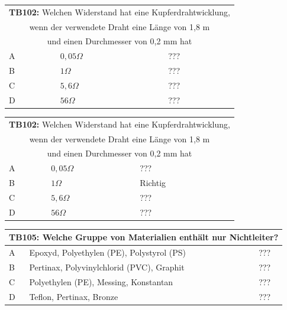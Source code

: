 \begin{frame}
	\begin{small}	
	\begin{tabular}{|l|l|l|}
	\hline
		\multicolumn{3}{|c|}{\textbf{TB102:} Welchen Widerstand hat eine Kupferdrahtwicklung,}\\
		\multicolumn{3}{|c|}{wenn der verwendete Draht eine Länge von 1,8 m}\\
		\multicolumn{3}{|c|}{und einen Durchmesser von 0,2 mm hat}\\
		\hline
		A &  $0,05 \Omega$  & ??? \\ \hline
		B &  $1 \Omega$ & ??? \\ \hline
		C & $ 5,6 \Omega$ & ??? \\ \hline
		D & $56 \Omega$  & ??? \\ \hline 		
	\end{tabular}
	\end{small}
\end{frame}
\begin{frame}
	\begin{small}	
	\begin{tabular}{|l|l|l|}
	\hline
		\multicolumn{3}{|c|}{\textbf{TB102:} Welchen Widerstand hat eine Kupferdrahtwicklung,}\\
		\multicolumn{3}{|c|}{wenn der verwendete Draht eine Länge von 1,8 m}\\
		\multicolumn{3}{|c|}{und einen Durchmesser von 0,2 mm hat}\\
		\hline
		A &  $0,05 \Omega$  & ??? \\ \hline
		B &  $1 \Omega$ & Richtig \\ \hline
		C & $ 5,6 \Omega$ & ??? \\ \hline
		D & $56 \Omega$  & ??? \\ \hline 		
	\end{tabular}
	\end{small}
\end{frame}

\begin{frame}
	\begin{small}	
	\begin{tabular}{|l|l|l|}
	\hline
		\multicolumn{3}{|c|}{\textbf{TB105:} Welche Gruppe von Materialien enthält nur Nichtleiter?}\\
		\hline
		A & Epoxyd, Polyethylen (PE), Polystyrol (PS) & ??? \\ \hline
		B & Pertinax, Polyvinylchlorid (PVC), Graphit & ??? \\ \hline
		C & Polyethylen (PE), Messing, Konstantan & ??? \\ \hline
		D & Teflon, Pertinax, Bronze & ??? \\ \hline 		
	\end{tabular}
	\end{small}
\end{frame}

